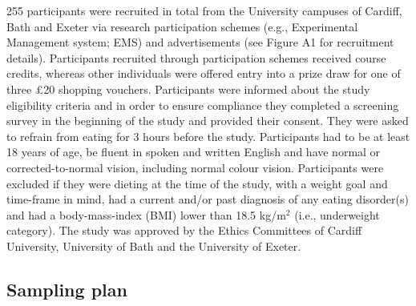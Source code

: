 \documentclass[man,floatsintext]{apa6}
\begin{document}
\par

255 participants were recruited in total from the University campuses of
Cardiff, Bath and Exeter via research participation schemes (e.g.,
Experimental Management system; EMS) and advertisements (see Figure A1
for recruitment details). Participants recruited through participation
schemes received course credits, whereas other individuals were offered
entry into a prize draw for one of three £20 shopping vouchers.
Participants were informed about the study eligibility criteria and in
order to ensure compliance they completed a screening survey in the
beginning of the study and provided their consent. They were asked to
refrain from eating for 3 hours before the study. Participants had to be
at least 18 years of age, be fluent in spoken and written English and
have normal or corrected-to-normal vision, including normal colour
vision. Participants were excluded if they were dieting at the time of
the study, with a weight goal and time-frame in mind, had a current
and/or past diagnosis of any eating disorder(s) and had a
body-mass-index (BMI) lower than 18.5 kg/m\(^{2}\) (i.e., underweight
category). The study was approved by the Ethics Committees of Cardiff
University, University of Bath and the University of Exeter.

\subsection{Sampling plan}\label{sampling}

\par
\end{document}
